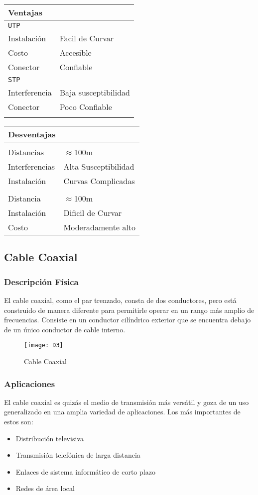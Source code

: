 \begin{center}
\begin{tabular}{*2l}
\toprule
Ventajas &   {} \\
\midrule
\texttt{UTP} & {} \\
Instalación & Facil de Curvar\\

Costo & Accesible\\

Conector & Confiable\\
\texttt{STP} & {} \\
Interferencia & Baja susceptibilidad \\
Conector & Poco Confiable \\
{}&{}\\
\bottomrule
\end{tabular}
\quad
\begin{tabular}{*2l}
\toprule
Desventajas &   {} \\
\midrule
{} & {} \\
Distancias   & $\approx$100m   \\
Interferencias   &  Alta Susceptibilidad\\
Instalación   &  Curvas Complicadas\\
{} & {} \\
Distancia & $\approx$100m\\
Instalación & Dificil de Curvar\\
Costo & Moderadamente alto\\
\bottomrule
\end{tabular}
\end{center}
\subsection{Cable Coaxial}
\subsubsection{Descripción Física}
El cable coaxial, como el par trenzado, consta de dos conductores, pero está construido de manera diferente para permitirle operar en un rango más amplio de frecuencias. Consiste en un conductor cilíndrico exterior que se encuentra debajo de un único conductor de cable interno.
\begin{figure}[!ht]
\centering
\texttt{[image: D3]}
\caption{Cable Coaxial}
\end{figure}
\subsubsection{Aplicaciones}
El cable coaxial es quizás el medio de transmisión más versátil y goza de un uso generalizado en una amplia variedad de aplicaciones. Los más importantes de estos son:
\begin{itemize}
\item Distribución televisiva
\item Transmisión telefónica de larga distancia
\item Enlaces de sistema informático de corto plazo
\item Redes de área local
\end{itemize}
